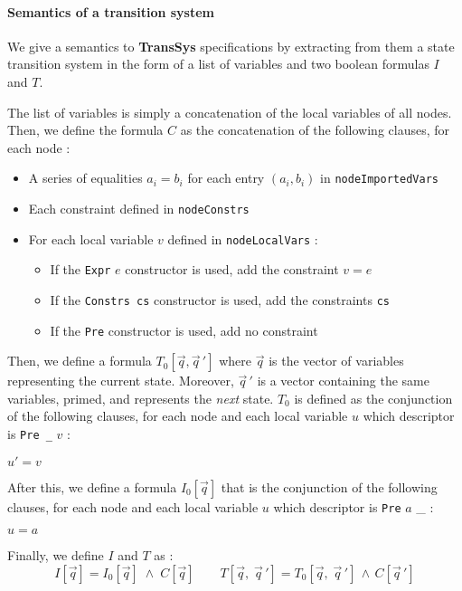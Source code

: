 \paragraph{Semantics of a transition system}
We give a semantics to \textbf{TransSys} specifications by extracting from them a state transition system in the form of a list of variables and two boolean formulas $I$ and $T$. 

The list of variables is simply a concatenation of the local variables of all nodes. Then, we define the formula $C$ as the concatenation of the following clauses, for each node :


\begin{itemize}
\item A series of equalities $a_i = b_i$ for each entry $(a_i, b_i)$ in \texttt{nodeImportedVars}
\item Each constraint defined in \texttt{nodeConstrs}
\item For each local variable $v$ defined in \texttt{nodeLocalVars} :

\begin{itemize}
\item If the \texttt{Expr} $e$ constructor is used, add the constraint $v = e$
\item If the \texttt{Constrs cs} constructor is used, add the constraints \texttt{cs} 
\item If the \texttt{Pre} constructor is used, add no constraint
\end{itemize}

\end{itemize}


Then, we define a formula $T_0[\vec q, \vec q \,']$ where $\vec q$ is the vector of variables representing the current state. Moreover, $\vec q \,'$ is a vector containing the same variables, primed, and represents the \textit{next} state. $T_0$ is defined as the conjunction of the following clauses, for each node and each local variable $u$ which descriptor is \texttt{Pre \_} $v$ :
\begin{center} $u' = v$ \end{center}
After this, we define a formula $I_0[\vec q]$ that  is the conjunction of the following clauses, for each node and each local variable $u$ which descriptor is \texttt{Pre} $a$ \_ :
\begin{center} $u = a$ \end{center}
Finally, we define $I$ and $T$ as :
\[  I[\vec q] =  I_0[\vec q] \;\wedge\; C[\vec q] \qquad T[\vec q, \; \vec q \, '] = T_0[\vec q, \; \vec q \,'] \, \wedge \, C[\vec q \, ']  \]




